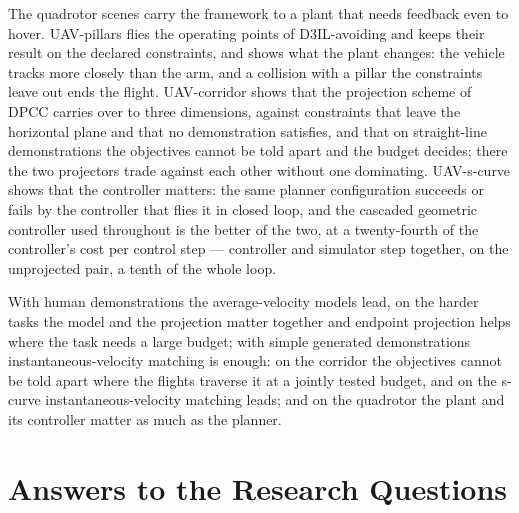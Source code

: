The quadrotor scenes carry the framework to a plant that needs feedback even to hover. UAV-pillars flies
the operating points of D3IL-avoiding and keeps their result on the declared constraints, and shows
what the plant changes: the vehicle tracks more closely than the arm, and a collision with a pillar the
constraints leave out ends the flight. UAV-corridor shows that the projection scheme of \ac{DPCC}
carries over to three dimensions, against constraints that leave the horizontal plane and that no
demonstration satisfies, and that on straight-line demonstrations the objectives cannot be told
apart and the budget decides; there the two projectors trade against each other without one dominating.
UAV-s-curve shows that the controller matters: the same planner configuration succeeds or fails by
the controller that flies it in closed loop, and the cascaded geometric controller used throughout is
the better of the two, at a twenty-fourth of the controller's cost per control step --- controller
and simulator step together, on the unprojected pair, a tenth of the whole loop.

With human demonstrations the average-velocity models lead, on the harder tasks the model and the
projection matter together and endpoint projection helps where the task needs a large budget; with
simple generated demonstrations instantaneous-velocity matching is enough: on the corridor the
objectives cannot be told apart where the flights traverse it at a jointly tested budget, and on the
s-curve instantaneous-velocity matching leads; and on the quadrotor the plant and its controller
matter as much as the planner.

\section{Answers to the Research Questions}\label{sec:conc:rqs}

